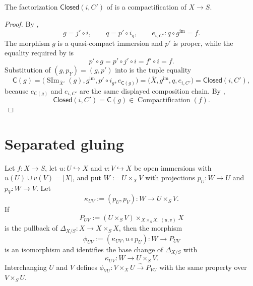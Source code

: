 \begin{proposition}
  \label{prop:nagata-closed-subscheme-compactifiable}

  The factorization $\mathsf{Closed}(i,C')$ of
   is a compactification
  of $X\to S$.
\end{proposition}

\begin{proof}
  By ,
  \[
    g=j'\circ i,
    \qquad
    q=p'\circ i_g,
    \qquad
    e_{i,C'}\colon q\circ g^{\mathrm{im}}=f.
  \]
  The morphism $g$ is a quasi-compact immersion and $p'$ is proper, while
  the equality required by
   is
  \[
    p'\circ g
      =p'\circ j'\circ i
      =f'\circ i=f.
  \]
  Substitution of $(g,p_Y)=(g,p')$ into
   is the tuple equality
  \[
    \mathsf C(g)
      =\bigl(\operatorname{SIm}_{\overline X'}(g),
        g^{\mathrm{im}},p'\circ i_g,e_{\mathsf C(g)}\bigr)
      =\bigl(\overline X,g^{\mathrm{im}},q,e_{i,C'}\bigr)
      =\mathsf{Closed}(i,C'),
  \]
  because $e_{\mathsf C(g)}$ and $e_{i,C'}$ are the same displayed
  composition chain.  By
  ,
  \[
    \mathsf{Closed}(i,C')=\mathsf C(g)
      \in\operatorname{Compactification}(f).
  \]
\end{proof}

\section{Separated gluing}

\begin{lemma}
  \label{lemma:nagata-diagonal-mixed-open}

  Let $f\colon X\to S$, let $u\colon U\hookrightarrow X$ and
  $v\colon V\hookrightarrow X$ be open immersions with
  $u(U)\cup v(V)=|X|$, and put $W:=U\times_XV$ with projections
  $p_U\colon W\to U$ and $p_V\colon W\to V$.  Let
  \[
    \kappa_{UV}:=(p_U,p_V)\colon W\longrightarrow U\times_SV.
  \]
  If
  \[
    P_{UV}:=(U\times_SV)\times_{X\times_SX,\,(u,v)}X
  \]
  is the pullback of $\Delta_{X/S}\colon X\to X\times_SX$, then the morphism
  \[
    \phi_{UV}:=(\kappa_{UV},u\circ p_U)\colon W\longrightarrow P_{UV}
  \]
  is an isomorphism and identifies the base change of $\Delta_{X/S}$ with
  \[
    \kappa_{UV}\colon W\longrightarrow U\times_SV.
  \]
  Interchanging $U$ and $V$ defines
  $\phi_{VU}\colon V\times_XU\xrightarrow{\sim}P_{VU}$ with the same
  property over $V\times_SU$.
\end{lemma}

